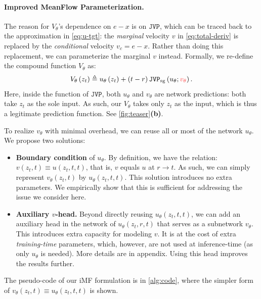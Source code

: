 

\paragraph{Improved MeanFlow Parameterization.}
The reason for $V_\theta$'s dependence on $e-x$ is on $\mathtt{JVP}$, which can be traced back to the approximation in \cref{eq:u-tgt}: the \textit{marginal} velocity $v$ in \cref{eq:total-deriv} is replaced by the \textit{conditional} velocity $v_c=e-x$. Rather than doing this replacement, we can parameterize the marginal $v$ instead. Formally, we re-define the compound function $V_\theta$ as:
\begin{equation}
    V_\theta\,(z_t) \\
    \triangleq u_\theta\,(z_t) + (t-r)\,\sgjvp\left(u_\theta; \textcolor[RGB]{255, 64, 64}{v_\theta}\right).
\label{eq:imf-vpred}
\end{equation}
Here, inside the function of $\mathtt{JVP}$, both $u_\theta$ and $v_\theta$ are network predictions: both take $z_t$ as the sole input. As such, our $V_\theta$ takes only $z_t$ as the input, which is thus a legitimate prediction function. See \cref{fig:teaser}\textbf{(b)}.

To realize ${v_\theta}$ with minimal overhead, we can reuse all or most of the network $u_\theta$.
We propose two solutions:
\begin{itemize}[leftmargin=1em, rightmargin=0em]
    \item \textbf{Boundary condition} of $u_\theta$. By definition, we have the relation: $v(z_t, t) \equiv u(z_t, t, t)$, that is, $v$ equals $u$ at $r\rightarrow t$. As such, we can simply represent $v_\theta(z_t, t)$ by $u_\theta(z_t, t, t)$. This solution introduces no extra parameters. We empirically show that this is sufficient for addressing the issue we consider here.
    \item \textbf{Auxiliary $v$-head.} Beyond directly reusing $u_\theta(z_t, t, t)$, we can add an auxiliary head in the network of $u_\theta(z_t, r, t)$ that serves as a subnetwork $v_\theta$. This introduces extra capacity for modeling $v$. It is at the cost of extra \textit{training-time} parameters, which, however, are not used at inference-time (as only $u_\theta$ is needed). 
    More details are in appendix.
    Using this head improves the results further.
\end{itemize}

\noindent
The pseudo-code of our iMF formulation is in \cref{alg:code}, where the simpler form of $v_\theta(z_t, t) \equiv u_\theta(z_t, t, t)$ is shown.


